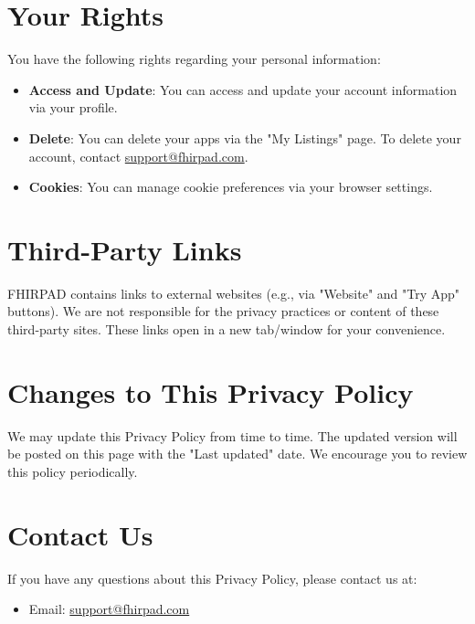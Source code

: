 \documentclass[a4paper,12pt]{article}
\begin{document}
\section{Your Rights}
You have the following rights regarding your personal information:
\begin{itemize}
    \item \textbf{Access and Update}: You can access and update your account information via your profile.
    \item \textbf{Delete}: You can delete your apps via the "My Listings" page. To delete your account, contact \href{mailto:support@fhirpad.com}{support@fhirpad.com}.
    \item \textbf{Cookies}: You can manage cookie preferences via your browser settings.
\end{itemize}

\section{Third-Party Links}
FHIRPAD contains links to external websites (e.g., via "Website" and "Try App" buttons). We are not responsible for the privacy practices or content of these third-party sites. These links open in a new tab/window for your convenience.

\section{Changes to This Privacy Policy}
We may update this Privacy Policy from time to time. The updated version will be posted on this page with the "Last updated" date. We encourage you to review this policy periodically.

\section{Contact Us}
If you have any questions about this Privacy Policy, please contact us at:
\begin{itemize}
    \item Email: \href{mailto:support@fhirpad.com}{support@fhirpad.com}
\end{itemize}
\end{document}
